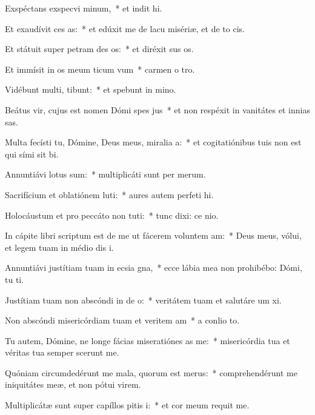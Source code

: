 \item Exspéctans exspecvi minum,~* et indit hi.
\item Et exaudívit ces as:~* et edúxit me de lacu misériæ, et de to cis.
\item Et státuit super petram des os:~* et diréxit sus os.
\item Et immísit in os meum ticum vum~* carmen o tro.
\item Vidébunt multi,  tibunt:~* et spebunt in mino.
\item Beátus vir, cujus est nomen Dómi spes jus~* et non respéxit in vanitátes et innias sas.
\item Multa fecísti tu, Dómine, Deus meus, miralia a:~* et cogitatiónibus tuis non est qui sími sit bi.
\item Annuntiávi  lotus sum:~* multiplicáti sunt per merum.
\item Sacrifícium et oblatiónem luti:~* aures autem perfeti hi.
\item Holocáustum et pro peccáto non tuti:~* tunc dixi: ce nio.
\item In cápite libri scriptum est de me ut fácerem voluntem am:~* Deus meus, vólui, et legem tuam in médio dis i.
\item Annuntiávi justítiam tuam in ecsia gna,~* ecce lábia mea non prohibébo: Dómi, tu ti.
\item Justítiam tuam non abscóndi in de o:~* veritátem tuam et salutáre um xi.
\item Non abscóndi misericórdiam tuam et veritem am~* a conlio to.
\item Tu autem, Dómine, ne longe fácias miseratiónes as  me:~* misericórdia tua et véritas tua semper scerunt me.
\item Quóniam circumdedérunt me mala, quorum  est merus:~* comprehendérunt me iniquitátes meæ, et non pótui  virem.
\item Multiplicátæ sunt super capíllos pitis i:~* et cor meum requit me.
